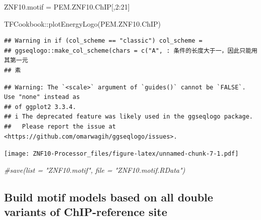 \documentclass[
]{article}
\newenvironment{Shaded}{\begin{snugshade}}{\end{snugshade}}
\newcommand{\CommentTok}[1]{\textcolor[rgb]{0.56,0.35,0.01}{\textit{#1}}}
\newcommand{\DecValTok}[1]{\textcolor[rgb]{0.00,0.00,0.81}{#1}}
\newcommand{\FunctionTok}[1]{\textcolor[rgb]{0.00,0.00,0.00}{#1}}
\newcommand{\NormalTok}[1]{#1}
\newcommand{\OtherTok}[1]{\textcolor[rgb]{0.56,0.35,0.01}{#1}}
\newcommand{\SpecialCharTok}[1]{\textcolor[rgb]{0.00,0.00,0.00}{#1}}
\begin{document}
\begin{Shaded}
\begin{Highlighting}[]
\NormalTok{ZNF10.motif }\OtherTok{=}\NormalTok{ PEM.ZNF10.ChIP[,}\DecValTok{2}\SpecialCharTok{:}\DecValTok{21}\NormalTok{]}

\NormalTok{TFCookbook}\SpecialCharTok{::}\FunctionTok{plotEnergyLogo}\NormalTok{(PEM.ZNF10.ChIP)}
\end{Highlighting}
\end{Shaded}

\begin{verbatim}
## Warning in if (col_scheme == "classic") col_scheme =
## ggseqlogo::make_col_scheme(chars = c("A", : 条件的长度大于一，因此只能用其第一元
## 素
\end{verbatim}

\begin{verbatim}
## Warning: The `<scale>` argument of `guides()` cannot be `FALSE`. Use "none" instead as
## of ggplot2 3.3.4.
## i The deprecated feature was likely used in the ggseqlogo package.
##   Please report the issue at <https://github.com/omarwagih/ggseqlogo/issues>.
\end{verbatim}

\texttt{[image: ZNF10-Processor\_files/figure-latex/unnamed-chunk-7-1.pdf]}

\begin{Shaded}
\begin{Highlighting}[]
\CommentTok{\#save(list = "ZNF10.motif", file = "ZNF10.motif.RData")}
\end{Highlighting}
\end{Shaded}

\hypertarget{build-motif-models-based-on-all-double-variants-of-chip-reference-site}{%
\subsection{Build motif models based on all double variants of
ChIP-reference
site}\label{build-motif-models-based-on-all-double-variants-of-chip-reference-site}}
\end{document}

